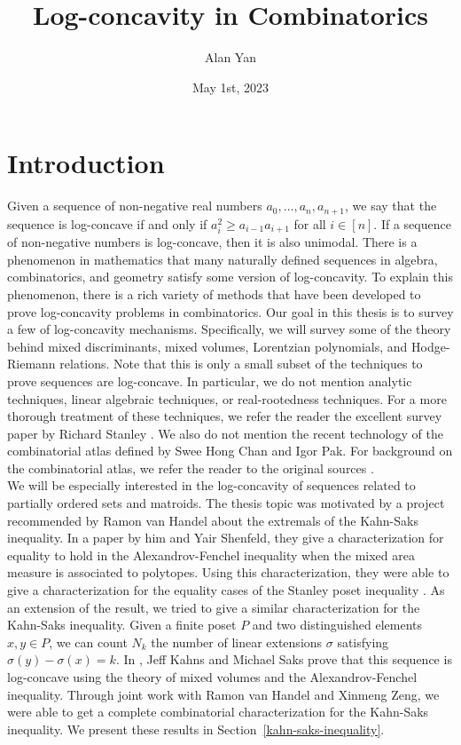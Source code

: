 \documentclass{puthesis-UG}
\author{Alan Yan}
\title{Log-concavity in Combinatorics}
\date{May 1st, 2023}
\begin{document}
\chapter*{Introduction}

Given a sequence of non-negative real numbers $a_0, \ldots, a_n, a_{n+1}$, we say that the sequence is log-concave if and only if $a_i^2 \geq a_{i-1} a_{i+1}$ for all $i \in [n]$. If a sequence of non-negative numbers is log-concave, then it is also unimodal. There is a phenomenon in mathematics that many naturally defined sequences in algebra, combinatorics, and geometry satisfy some version of log-concavity. To explain this phenomenon, there is a rich variety of methods that have been developed to prove log-concavity problems in combinatorics. Our goal in this thesis is to survey a few of log-concavity mechanisms. Specifically, we will survey some of the theory behind mixed discriminants, mixed volumes, Lorentzian polynomials, and Hodge-Riemann relations. Note that this is only a small subset of the techniques to prove sequences are log-concave. In particular, we do not mention analytic techniques, linear algebraic techniques, or real-rootedness techniques. For a more thorough treatment of these techniques, we refer the reader the excellent survey paper by Richard Stanley \cite{Stanley1989LogConcaveAU}. We also do not mention the recent technology of the combinatorial atlas defined by Swee Hong Chan and Igor Pak. For background on the combinatorial atlas, we refer the reader to the original sources \cite{logconcave-poset-inequalities,combinatorial-atlas}. \\

We will be especially interested in the log-concavity of sequences related to partially ordered sets and matroids. The thesis topic was motivated by a project recommended by Ramon van Handel about the extremals of the Kahn-Saks inequality. In a paper by him and Yair Shenfeld, they give a characterization for equality to hold in the Alexandrov-Fenchel inequality when the mixed area measure is associated to polytopes. Using this characterization, they were able to give a characterization for the equality cases of the Stanley poset inequality \cite{STANLEY}. As an extension of the result, we tried to give a similar characterization for the Kahn-Saks inequality. Given a finite poset $P$ and two distinguished elements $x, y \in P$, we can count $N_k$ the number of linear extensions $\sigma$ satisfying $\sigma (y) - \sigma (x) = k$. In \cite{balancing-poset-extensions}, Jeff Kahns and Michael Saks prove that this sequence is log-concave using the theory of mixed volumes and the Alexandrov-Fenchel inequality. Through joint work with Ramon van Handel and Xinmeng Zeng, we were able to get a complete combinatorial characterization for the Kahn-Saks inequality. We present these results in Section~\ref{kahn-saks-inequality}. \\
\end{document}
